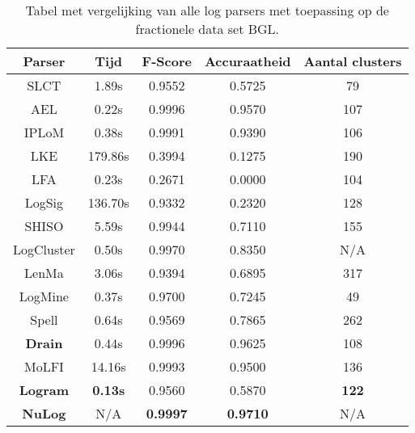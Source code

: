 \begin{table}[!htp]
    \caption{Tabel met vergelijking van alle log parsers met toepassing op de fractionele data set BGL.}
    \label{table:BGL}
    \begin{center}
        \begin{tabular}{||c | c | c | c | c||} 
            \hline
            Parser & Tijd & F-Score & Accuraatheid & Aantal clusters \\ [0.5ex] 
            \hline\hline
            SLCT & 1.89s & 0.9552 & 0.5725 & 79 \\
            
            AEL & 0.22s & 0.9996 & 0.9570 & 107 \\ 
            
            IPLoM & 0.38s & 0.9991 & 0.9390 & 106 \\
            
            LKE & 179.86s & 0.3994 & 0.1275 & 190 \\
            
            LFA & 0.23s & 0.2671 & 0.0000 & 104 \\
            
            LogSig & 136.70s & 0.9332 & 0.2320 & 128 \\
            
            SHISO & 5.59s & 0.9944 & 0.7110 & 155 \\
            
            LogCluster & 0.50s & 0.9970 & 0.8350 & N/A \\
            
            LenMa & 3.06s & 0.9394 & 0.6895 & 317 \\
            
            LogMine & 0.37s & 0.9700 & 0.7245 & 49 \\
            
            Spell & 0.64s & 0.9569 & 0.7865 & 262 \\
            
            \textbf{Drain} & 0.44s & 0.9996 & 0.9625 & 108 \\
            
            MoLFI & 14.16s & 0.9993 & 0.9500 & 136 \\
            
            \textbf{Logram} & \textbf{0.13s} & 0.9560 & 0.5870 & \textbf{122} \\
            
            \textbf{NuLog} & N/A & \textbf{0.9997} & \textbf{0.9710} & N/A \\
            \hline
        \end{tabular}
    \end{center}
\end{table}


